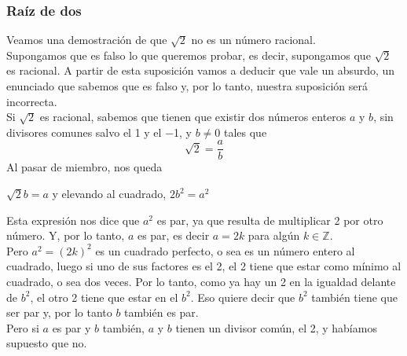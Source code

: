 \documentclass[Análisis.root.tex]{subfiles}
\newcommand{\Z}{\mathbb{Z}}
\begin{document}
        \subsubsection{Raíz de dos}
        Veamos una demostración de que \(\sqrt{2}\) no es un número racional.\\
        Supongamos que es falso lo que queremos probar, es decir, supongamos que \(\sqrt{2}\) es racional. A partir de esta suposición vamos a deducir que vale un absurdo, un enunciado que sabemos que es falso y, por lo tanto, nuestra suposición será incorrecta.\\
        Si \(\sqrt{2}\) es racional, sabemos que tienen que existir dos números enteros \(a\) y \(b\), sin divisores comunes salvo el 1 y el −1, y \(b \neq 0\) tales que \[\sqrt{2}=\frac{a}{b}\] Al pasar de miembro, nos queda
        \begin{center}
            \(\sqrt{2}b=a\) y elevando al cuadrado, \(2b^2=a^2\)
        \end{center}
        Esta expresión nos dice que \(a^2\) es par, ya que resulta de multiplicar 2 por otro número. Y, por lo tanto, \(a\) es par, es decir \(a = 2k\) para algún \(k \in \Z\).\\
        Pero \(a^2 = (2k)^2\) es un cuadrado perfecto, o sea es un número entero al cuadrado, luego si uno de sus factores es el 2, el 2 tiene que estar como mínimo al cuadrado, o sea dos veces. Por lo tanto, como ya hay un 2 en la igualdad delante de \(b^2\), el otro 2 tiene que estar en el \(b^2\). Eso quiere decir que \(b^2\) también tiene que ser par y, por lo tanto \(b\) también es par.\\
        Pero si \(a\) es par y \(b\) también, \(a\) y \(b\) tienen un divisor común, el 2, y habíamos supuesto que no.
\end{document}
